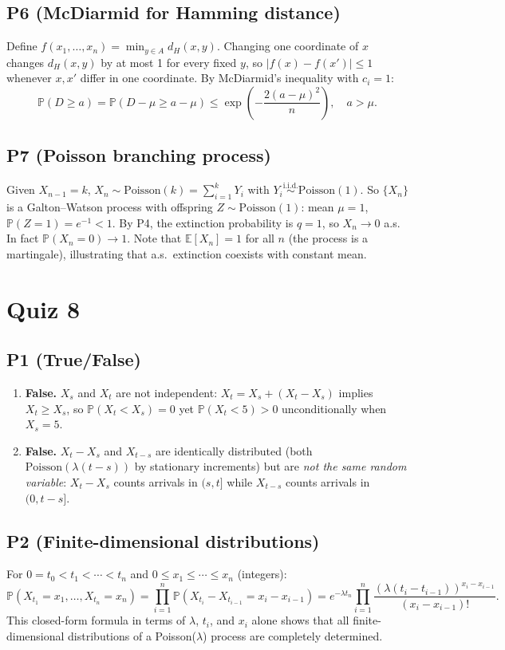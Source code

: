 \documentclass[11pt]{article}
\newcommand{\PP}{\mathbb{P}}
\newcommand{\EE}{\mathbb{E}}
\newcommand{\1}{\mathbf{1}}
\begin{document}
\subsection*{P6 (McDiarmid for Hamming distance)}
Define $f(x_1,\ldots,x_n)=\min_{y\in A}d_H(x,y)$.  Changing one coordinate of $x$ changes $d_H(x,y)$ by at most 1 for every fixed $y$, so $|f(x)-f(x')|\le1$ whenever $x,x'$ differ in one coordinate.  By McDiarmid's inequality with $c_i=1$:
\[
\PP(D\ge a)=\PP(D-\mu\ge a-\mu)\le\exp\!\left(-\frac{2(a-\mu)^2}{n}\right),\quad a>\mu.
\]

\subsection*{P7 (Poisson branching process)}
Given $X_{n-1}=k$, $X_n\sim\mathrm{Poisson}(k)=\sum_{i=1}^k Y_i$ with $Y_i\overset{\text{i.i.d.}}{\sim}\mathrm{Poisson}(1)$.  So $\{X_n\}$ is a Galton--Watson process with offspring $Z\sim\mathrm{Poisson}(1)$: mean $\mu=1$, $\PP(Z=1)=e^{-1}<1$.  By P4, the extinction probability is $q=1$, so $X_n\to0$ a.s.  In fact $\PP(X_n=0)\to1$.  Note that $\EE[X_n]=1$ for all $n$ (the process is a martingale), illustrating that a.s.\ extinction coexists with constant mean.

\section{Quiz 8}

\subsection*{P1 (True/False)}
\begin{enumerate}
\item \textbf{False.} $X_s$ and $X_t$ are not independent: $X_t=X_s+(X_t-X_s)$ implies $X_t\ge X_s$, so $\PP(X_t<X_s)=0$ yet $\PP(X_t<5)>0$ unconditionally when $X_s=5$.
\item \textbf{False.} $X_t-X_s$ and $X_{t-s}$ are identically distributed (both $\mathrm{Poisson}(\lambda(t-s))$ by stationary increments) but are \emph{not the same random variable}: $X_t-X_s$ counts arrivals in $(s,t]$ while $X_{t-s}$ counts arrivals in $(0,t-s]$.
\end{enumerate}

\subsection*{P2 (Finite-dimensional distributions)}
For $0=t_0<t_1<\cdots<t_n$ and $0\le x_1\le\cdots\le x_n$ (integers):
\[
\PP(X_{t_1}=x_1,\ldots,X_{t_n}=x_n)
=\prod_{i=1}^n\PP(X_{t_i}-X_{t_{i-1}}=x_i-x_{i-1})
=e^{-\lambda t_n}\prod_{i=1}^n\frac{(\lambda(t_i-t_{i-1}))^{x_i-x_{i-1}}}{(x_i-x_{i-1})!}.
\]
This closed-form formula in terms of $\lambda$, $t_i$, and $x_i$ alone shows that all finite-dimensional distributions of a Poisson($\lambda$) process are completely determined.
\end{document}
